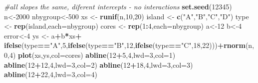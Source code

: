 \documentclass[
]{book}
\newenvironment{Shaded}{\begin{snugshade}}{\end{snugshade}}
\newcommand{\AttributeTok}[1]{\textcolor[rgb]{0.13,0.29,0.53}{#1}}
\newcommand{\CommentTok}[1]{\textcolor[rgb]{0.56,0.35,0.01}{\textit{#1}}}
\newcommand{\DecValTok}[1]{\textcolor[rgb]{0.00,0.00,0.81}{#1}}
\newcommand{\FunctionTok}[1]{\textcolor[rgb]{0.13,0.29,0.53}{\textbf{#1}}}
\newcommand{\NormalTok}[1]{#1}
\newcommand{\OtherTok}[1]{\textcolor[rgb]{0.56,0.35,0.01}{#1}}
\newcommand{\SpecialCharTok}[1]{\textcolor[rgb]{0.81,0.36,0.00}{\textbf{#1}}}
\newcommand{\StringTok}[1]{\textcolor[rgb]{0.31,0.60,0.02}{#1}}
\begin{document}
\begin{Shaded}
\begin{Highlighting}[]
\CommentTok{\#all slopes the same, diferent intercepts {-} no interactions}
\FunctionTok{set.seed}\NormalTok{(}\DecValTok{12345}\NormalTok{)}
\NormalTok{n}\OtherTok{\textless{}{-}}\DecValTok{2000}
\NormalTok{nbygroup}\OtherTok{\textless{}{-}}\DecValTok{500}
\NormalTok{xs }\OtherTok{\textless{}{-}} \FunctionTok{runif}\NormalTok{(n,}\DecValTok{10}\NormalTok{,}\DecValTok{20}\NormalTok{)}
\NormalTok{island }\OtherTok{\textless{}{-}} \FunctionTok{c}\NormalTok{(}\StringTok{"A"}\NormalTok{,}\StringTok{"B"}\NormalTok{,}\StringTok{"C"}\NormalTok{,}\StringTok{"D"}\NormalTok{)}
\NormalTok{type }\OtherTok{\textless{}{-}} \FunctionTok{rep}\NormalTok{(island,}\AttributeTok{each=}\NormalTok{nbygroup)}
\NormalTok{cores }\OtherTok{\textless{}{-}} \FunctionTok{rep}\NormalTok{(}\DecValTok{1}\SpecialCharTok{:}\DecValTok{4}\NormalTok{,}\AttributeTok{each=}\NormalTok{nbygroup)}
\NormalTok{a}\OtherTok{\textless{}{-}}\DecValTok{12}
\NormalTok{b}\OtherTok{\textless{}{-}}\DecValTok{4}
\NormalTok{error}\OtherTok{\textless{}{-}}\DecValTok{4}
\NormalTok{ys }\OtherTok{\textless{}{-}}\NormalTok{ a}\SpecialCharTok{+}\NormalTok{b}\SpecialCharTok{*}\NormalTok{xs}\SpecialCharTok{+}
\FunctionTok{ifelse}\NormalTok{(type}\SpecialCharTok{==}\StringTok{"A"}\NormalTok{,}\DecValTok{5}\NormalTok{,}\FunctionTok{ifelse}\NormalTok{(type}\SpecialCharTok{==}\StringTok{"B"}\NormalTok{,}\DecValTok{12}\NormalTok{,}\FunctionTok{ifelse}\NormalTok{(type}\SpecialCharTok{==}\StringTok{"C"}\NormalTok{,}\DecValTok{18}\NormalTok{,}\DecValTok{22}\NormalTok{)))}\SpecialCharTok{+}\FunctionTok{rnorm}\NormalTok{(n,}\DecValTok{0}\NormalTok{,}\DecValTok{4}\NormalTok{)}
\FunctionTok{plot}\NormalTok{(xs,ys,}\AttributeTok{col=}\NormalTok{cores)}
\FunctionTok{abline}\NormalTok{(}\DecValTok{12}\SpecialCharTok{+}\DecValTok{5}\NormalTok{,}\DecValTok{4}\NormalTok{,}\AttributeTok{lwd=}\DecValTok{3}\NormalTok{,}\AttributeTok{col=}\DecValTok{1}\NormalTok{)}
\FunctionTok{abline}\NormalTok{(}\DecValTok{12}\SpecialCharTok{+}\DecValTok{12}\NormalTok{,}\DecValTok{4}\NormalTok{,}\AttributeTok{lwd=}\DecValTok{3}\NormalTok{,}\AttributeTok{col=}\DecValTok{2}\NormalTok{)}
\FunctionTok{abline}\NormalTok{(}\DecValTok{12}\SpecialCharTok{+}\DecValTok{18}\NormalTok{,}\DecValTok{4}\NormalTok{,}\AttributeTok{lwd=}\DecValTok{3}\NormalTok{,}\AttributeTok{col=}\DecValTok{3}\NormalTok{)}
\FunctionTok{abline}\NormalTok{(}\DecValTok{12}\SpecialCharTok{+}\DecValTok{22}\NormalTok{,}\DecValTok{4}\NormalTok{,}\AttributeTok{lwd=}\DecValTok{3}\NormalTok{,}\AttributeTok{col=}\DecValTok{4}\NormalTok{)}
\end{Highlighting}
\end{Shaded}
\end{document}
